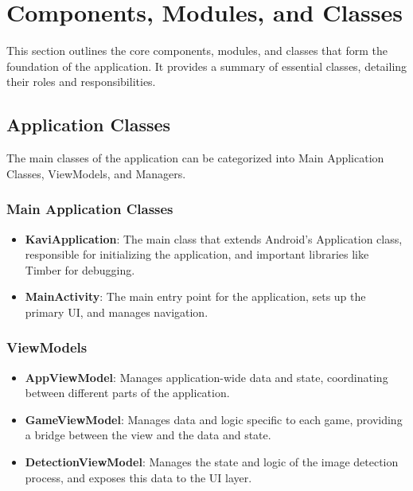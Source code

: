 \section{Components, Modules, and Classes}

This section outlines the core components, modules, and classes that form the foundation of the application. It provides a summary of essential classes, detailing their roles and responsibilities.

\subsection{Application Classes}
The main classes of the application can be categorized into Main Application Classes, ViewModels, and Managers.
\subsubsection{Main Application Classes}
\begin{itemize}
    \item \textbf{KaviApplication}: The main class that extends Android's Application class, responsible for initializing the application, and important libraries like Timber for debugging.
    \item \textbf{MainActivity}: The main entry point for the application, sets up the primary UI, and manages navigation.
\end{itemize}

\subsubsection{ViewModels}
\begin{itemize}
    \item \textbf{AppViewModel}: Manages application-wide data and state, coordinating between different parts of the application.
    \item \textbf{GameViewModel}: Manages data and logic specific to each game, providing a bridge between the view and the data and state.
    \item \textbf{DetectionViewModel}: Manages the state and logic of the image detection process, and exposes this data to the UI layer.
\end{itemize}

